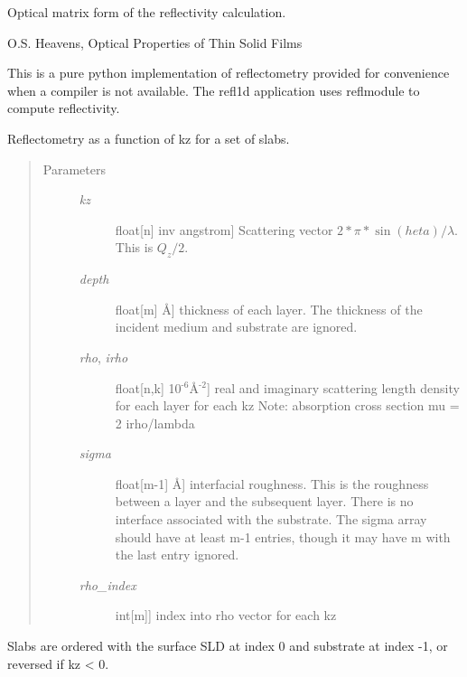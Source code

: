 \documentclass[letterpaper,10pt,english]{sphinxmanual}
\begin{document}
\label{api/abeles:module-refl1d.abeles}
Optical matrix form of the reflectivity calculation.

O.S. Heavens, Optical Properties of Thin Solid Films

This is a pure python implementation of reflectometry provided for
convenience when a compiler is not available.  The refl1d
application uses reflmodule to compute reflectivity.

\begin{fulllineitems}
\label{api/abeles:refl1d.abeles.calc}
\end{fulllineitems}


\begin{fulllineitems}
\label{api/abeles:refl1d.abeles.refl}
Reflectometry as a function of kz for a set of slabs.
\begin{quote}\begin{description}
\item[{Parameters }] \leavevmode\begin{description}
\item[{\emph{kz}}] \leavevmode{[}float{[}n{]} \textbar{} inv angstrom{]}
Scattering vector $2*\pi*\sin(      heta)/\lambda$. This is $Q_z/2$.

\item[{\emph{depth}}] \leavevmode{[}float{[}m{]} \textbar{} Å{]}
thickness of each layer.  The thickness of the incident medium
and substrate are ignored.

\item[{\emph{rho}, \emph{irho}}] \leavevmode{[}float{[}n,k{]} \textbar{} 10$^{\text{-6}}$Å$^{\text{-2}}${]}
real and imaginary scattering length density for each layer for each kz
Note: absorption cross section mu = 2 irho/lambda

\item[{\emph{sigma}}] \leavevmode{[}float{[}m-1{]} \textbar{} Å{]}
interfacial roughness.  This is the roughness between a layer
and the subsequent layer.  There is no interface associated
with the substrate.  The sigma array should have at least m-1
entries, though it may have m with the last entry ignored.

\item[{\emph{rho\_index}}] \leavevmode{[}int{[}m{]}{]}
index into rho vector for each kz

\end{description}

\end{description}\end{quote}

Slabs are ordered with the surface SLD at index 0 and substrate at
index -1, or reversed if kz \textless{} 0.

\end{fulllineitems}
\end{document}

